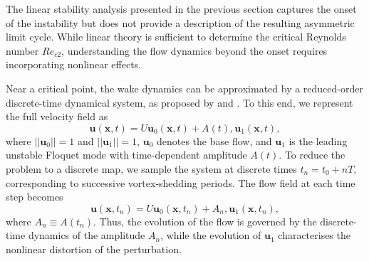 The linear stability analysis presented in the previous section captures the onset of the instability but does not provide a description of the resulting asymmetric limit cycle. While linear theory is sufficient to determine the critical Reynolds number $Re_{c2}$, understanding the flow dynamics beyond the onset requires incorporating nonlinear effects.

Near a critical point, the wake dynamics can be approximated by a reduced-order discrete-time dynamical system, as proposed by \cite{henderson-barkley-1996} and \cite{henderson-1997}. To this end, we represent the full velocity field as
%
\begin{equation}
\bm{u}(\bm{x}, t) = U \bm{u}_0(\bm{x}, t) + A(t), \bm{u}_1(\bm{x}, t),
\end{equation}
%
where $||\bm{u}_0||=1$ and $||\bm{u}_1||=1$, $\bm{u}_0$ denotes the base flow, and $\bm{u}_1$ is the leading unstable Floquet mode with time-dependent amplitude $A(t)$. To reduce the problem to a discrete map, we sample the system at discrete times $t_n = t_0 + nT$, corresponding to successive vortex-shedding periods. The flow field at each time step becomes
%
\begin{equation}
\bm{u}(\bm{x}, t_n) = U \bm{u}_0(\bm{x}, t_n) + A_n, \bm{u}_1(\bm{x}, t_n),
\end{equation}
%
where $A_n \equiv A(t_n)$. Thus, the evolution of the flow is governed by the discrete-time dynamics of the amplitude $A_n$, while the evolution of $\bm{u}_1$ characterises the nonlinear distortion of the perturbation.

